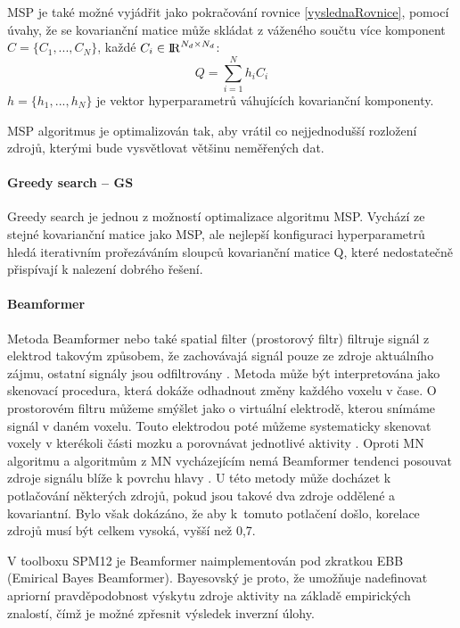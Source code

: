 MSP je také možné vyjádřit jako pokračování rovnice \ref{vyslednaRovnice}, pomocí úvahy, že se kovarianční matice může skládat z váženého součtu více komponent $C = \{C_1, ..., C_N\}$, každé $C_i \in {\rm I\!R}^{N_d \times N_d}$:
\begin{equation}
Q = \sum\limits_{i=1}^N h_i C_i 
\end{equation}
$h = \{h_1, ..., h_N\}$ je vektor hyperparametrů váhujících kovarianční komponenty. \cite{74}

MSP algoritmus je optimalizován tak, aby vrátil co nejjednodušší rozložení zdrojů, kterými bude vysvětlovat většinu neměřených dat. \cite{28}

\paragraph{Greedy search – GS}
Greedy search je jednou z možností optimalizace algoritmu MSP. Vychází ze stejné kovarianční matice jako MSP, ale nejlepší konfiguraci hyperparametrů hledá iterativním prořezáváním sloupců kovarianční matice Q, které nedostatečně přispívají k nalezení dobrého řešení. \cite{74}

\paragraph{Beamformer}
Metoda Beamformer nebo také spatial filter (prostorový filtr) filtruje signál z elektrod takovým způsobem, že zachovávajá signál pouze ze zdroje aktuálního zájmu, ostatní signály jsou odfiltrovány \cite{20}. Metoda může být interpretována jako skenovací procedura, která dokáže odhadnout změny každého voxelu v čase. O prostorovém filtru můžeme smýšlet jako o virtuální elektrodě, kterou snímáme signál v daném voxelu. Touto elektrodou poté můžeme systematicky skenovat voxely v kterékoli části mozku a porovnávat jednotlivé aktivity \cite{49}. Oproti MN algoritmu a algoritmům z MN vycházejícím nemá Beamformer tendenci posouvat zdroje signálu blíže k povrchu hlavy \cite{46}. U této metody může docházet k potlačování některých zdrojů, pokud jsou takové dva zdroje oddělené a kovariantní. Bylo však dokázáno, že aby k~tomuto potlačení došlo, korelace zdrojů musí být celkem vysoká, vyšší než 0,7. \cite{50}

V toolboxu SPM12 je Beamformer naimplementován pod zkratkou EBB (Emirical Bayes Beamformer). Bayesovský je proto, že umožňuje nadefinovat apriorní pravděpodobnost výskytu zdroje aktivity na základě empirických znalostí, čímž je možné zpřesnit výsledek inverzní úlohy.


